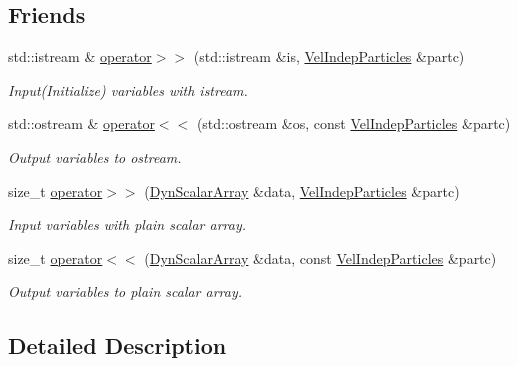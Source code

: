 \subsection*{Friends}
\begin{DoxyCompactItemize}
\item 
std\+::istream \& \mbox{\hyperlink{class_vel_indep_particles_a26d445a8934430c0634f60e387853724}{operator$>$$>$}} (std\+::istream \&is, \mbox{\hyperlink{class_vel_indep_particles}{Vel\+Indep\+Particles}} \&partc)
\begin{DoxyCompactList}\small\item\em Input(\+Initialize) variables with istream. \end{DoxyCompactList}\item 
std\+::ostream \& \mbox{\hyperlink{class_vel_indep_particles_afdcedfff1e424d7973f15783cc3f05cf}{operator$<$$<$}} (std\+::ostream \&os, const \mbox{\hyperlink{class_vel_indep_particles}{Vel\+Indep\+Particles}} \&partc)
\begin{DoxyCompactList}\small\item\em Output variables to ostream. \end{DoxyCompactList}\item 
size\+\_\+t \mbox{\hyperlink{class_vel_indep_particles_a1d6b6d70a1740a4887fe85aa75084d7f}{operator$>$$>$}} (\mbox{\hyperlink{class_vel_indep_particles_a6bba8ac3f941a144214037a27ccaa119}{Dyn\+Scalar\+Array}} \&data, \mbox{\hyperlink{class_vel_indep_particles}{Vel\+Indep\+Particles}} \&partc)
\begin{DoxyCompactList}\small\item\em Input variables with plain scalar array. \end{DoxyCompactList}\item 
size\+\_\+t \mbox{\hyperlink{class_vel_indep_particles_a0aabea652baadd76eec861b55d2b0857}{operator$<$$<$}} (\mbox{\hyperlink{class_vel_indep_particles_a6bba8ac3f941a144214037a27ccaa119}{Dyn\+Scalar\+Array}} \&data, const \mbox{\hyperlink{class_vel_indep_particles}{Vel\+Indep\+Particles}} \&partc)
\begin{DoxyCompactList}\small\item\em Output variables to plain scalar array. \end{DoxyCompactList}\end{DoxyCompactItemize}


\subsection{Detailed Description}
